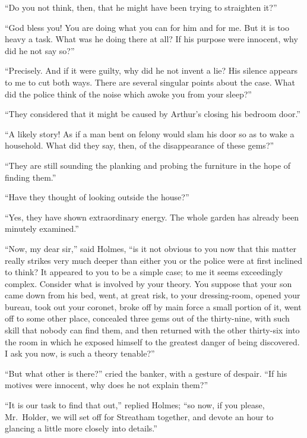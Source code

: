 “Do you not think, then, that he might have been trying to
straighten it?”

“God bless you! You are doing what you can for him and
for me. But it is too heavy a task. What was he doing there
at all? If his purpose were innocent, why did he not say so?”

“Precisely. And if it were guilty, why did he not invent a
lie? His silence appears to me to cut both ways. There are
several singular points about the case. What did the police
think of the noise which awoke you from your sleep?”

“They considered that it might be caused by Arthur’s closing
his bedroom door.”

“A likely story! As if a man bent on felony would slam
his door so as to wake a household. What did they say, then,
of the disappearance of these gems?”

“They are still sounding the planking and probing the
furniture in the hope of finding them.”

“Have they thought of looking outside the house?”

“Yes, they have shown extraordinary energy. The whole
garden has already been minutely examined.”

“Now, my dear sir,” said Holmes, “is it not obvious to
you now that this matter really strikes very much deeper than
either you or the police were at first inclined to think? It
appeared to you to be a simple case; to me it seems exceedingly
complex. Consider what is involved by your theory.
You suppose that your son came down from his bed, went, at
great risk, to your dressing-room, opened your bureau, took
out your coronet, broke off by main force a small portion of
it, went off to some other place, concealed three gems out of
the thirty-nine, with such skill that nobody can find them,
and then returned with the other thirty-six into the room in
which he exposed himself to the greatest danger of being discovered.
I ask you now, is such a theory tenable?”

“But what other is there?” cried the banker, with a gesture
of despair. “If his motives were innocent, why does he not
explain them?”

“It is our task to find that out,” replied Holmes; “so now,
if you please, Mr.~Holder, we will set off for Streatham together,
and devote an hour to glancing a little more closely
into details.”

